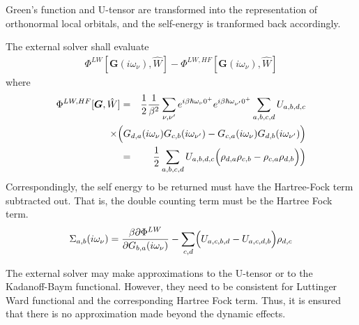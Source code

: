 \documentclass[11pt,a4paper]{report}
\newcommand{\mat}[1]{\bm{#1}}  %
\begin{document}
\begin{enumerate}
Green's function and U-tensor are transformed into the representation
of orthonormal local orbitals, and the self-energy is tranformed back
accordingly.

The external solver shall evaluate
\begin{eqnarray}
\Phi^{LW}[\mat{G}(i\omega_\nu),\hat{W}]
-\Phi^{LW,HF}[\mat{G}(i\omega_\nu),\hat{W}]
\end{eqnarray}
where
\begin{eqnarray}
  \Phi^{LW,HF}[\mat{G},\hat{W}]
  &=&
  \frac{1}{2}
  \frac{1}{\beta^{2}} 
  \sum_{\nu,\nu'} e^{i \beta \hbar \omega_\nu 0^{+}} e^{i \beta \hbar \omega_{\nu'} 0^{+}}
  \sum_{a,b,c,d}
  U_{a,b,d,c} 
  \nonumber\\ 
  &&\hspace{-1.2cm}\times\Big(
  G_{d,a}(i\omega_\nu)G_{c,b}(i\omega_{\nu'})
  -  G_{c,a}(i\omega_\nu)G_{d,b}(i\omega_{\nu'})
  \Big) 
\nonumber\\
&=& \frac{1}{2}
  \sum_{a,b,c,d}
  U_{a,b,d,c} \Bigl(
  \rho_{d,a}\rho_{c,b} -  \rho_{c,a}\rho_{d,b}\Bigr)
  \Big) 
\end{eqnarray}
Correspondingly, the self energy to be returned must have the
Hartree-Fock term subtracted out. That is, the double counting term
must be the Hartree Fock term.
\begin{eqnarray*}
\Sigma_{a,b}(i\omega_\nu)=\frac{\beta\partial\Phi^{LW}}
{\partial G_{b,a}(i\omega_\nu)}-\sum_{c,d}\Bigl(U_{a,c,b,d}-U_{a,c,d,b}\Bigr)
\rho_{d,c}
\end{eqnarray*}

The external solver may make approximations to the U-tensor or to the
Kadanoff-Baym functional. However, they need to be consistent for
Luttinger Ward functional and the corresponding Hartree Fock
term. Thus, it is ensured that there is no approximation made beyond
the dynamic effects.


\end{enumerate}
\end{document}

